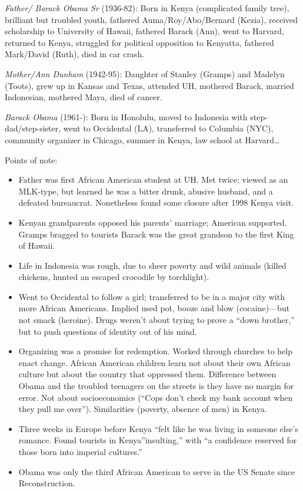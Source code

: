 \documentclass[
]{article}
\begin{document}
\emph{Father/ Barack Obama Sr} (1936-82): Born in Kenya (complicated
family tree), brilliant but troubled youth, fathered
Auma/Roy/Abo/Bernard (Kezia), received scholarship to University of
Hawaii, fathered Barack (Ann), went to Harvard, returned to Kenya,
struggled for political opposition to Kenyatta, fathered Mark/David
(Ruth), died in car crash.

\emph{Mother/Ann Dunham} (1942-95): Daughter of Stanley (Gramps) and
Madelyn (Toots), grew up in Kansas and Texas, attended UH, mothered
Barack, married Indonesian, mothered Maya, died of cancer.

\emph{Barack Obama} (1961-): Born in Honolulu, moved to Indonesia with
step-dad/step-sister, went to Occidental (LA), transferred to Columbia
(NYC), community organizer in Chicago, summer in Kenya, law school at
Harvard\ldots{}

Points of note:

\begin{itemize}
\item
  Father was first African American student at UH. Met twice; viewed as
  an MLK-type, but learned he was a bitter drunk, abusive husband, and a
  defeated bureaucrat. Nonetheless found some closure after 1998 Kenya
  visit.
\item
  Kenyan grandparents opposed his parents' marriage; American supported.
  Gramps bragged to tourists Barack was the great grandson to the first
  King of Hawaii.
\item
  Life in Indonesia was rough, due to sheer poverty and wild animals
  (killed chickens, hunted an escaped crocodile by torchlight).
\item
  Went to Occidental to follow a girl; transferred to be in a major city
  with more African Americans. Implied used pot, booze and blow
  (cocaine)---but not smack (heroine). Drugs weren't about trying to
  prove a ``down brother,'' but to push questions of identity out of his
  mind.
\item
  Organizing was a promise for redemption. Worked through churches to
  help enact change. African American children learn not about their own
  African culture but about the country that oppressed them. Difference
  between Obama and the troubled teenagers on the streets is they have
  no margin for error. Not about socioeconomics (``Cops don't check my
  bank account when they pull me over''). Similarities (poverty, absence
  of men) in Kenya.
\item
  Three weeks in Europe before Kenya ``felt like he was living in
  someone else's romance. Found tourists in Kenya''insulting,'' with ``a
  confidence reserved for those born into imperial cultures.''
\item
  Obama was only the third African American to serve in the US Senate
  since Reconstruction.
\end{itemize}
\end{document}
